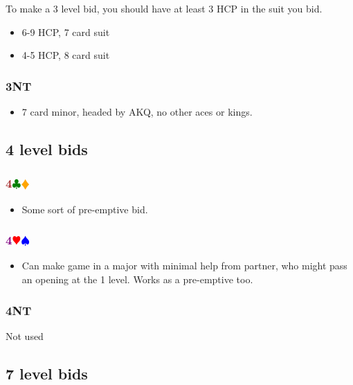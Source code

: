 \documentclass{article}
\newcommand{\Hs}{\textcolor{Red}{$\varheart$}}
\newcommand{\Ss}{\textcolor{Blue}{$\spadesuit$}}
\newcommand{\Ds}{\textcolor{Orange}{$\vardiamond$}}
\newcommand{\Cs}{\textcolor{Green}{$\clubsuit$}}
\newcommand{\NTs}{\textbf{\footnotesize{NT}}}
\newcommand{\NT}[1]{\textbf{#1\NTs}}
\newcommand{\minors}[1]{\textcolor{Brown}{\textbf{#1}}\Cs\Ds}
\newcommand{\majors}[1]{\textcolor{Purple}{\textbf{#1}}\Hs\Ss}
\begin{document}
To make a 3 level bid, you should have at least 3 HCP in the suit you bid.

\begin{itemize}
\item 6-9 HCP, 7 card suit
\item 4-5 HCP, 8 card suit
\end{itemize}

\subsubsection{\NT{3}}

\begin{itemize}
\item 7 card minor, headed by AKQ, no other aces or kings.
\end{itemize}

\subsection{4 level bids}

\subsubsection{\minors{4}}

\begin{itemize}
\item Some sort of pre-emptive bid.
\end{itemize}

\subsubsection{\majors{4}}

\begin{itemize}
\item Can make game in a major with minimal help from partner, who might pass an opening at the 1 level. Works as a pre-emptive too.
\end{itemize}

\subsubsection{\NT{4}}

Not used

\subsection{7 level bids}
\end{document}
